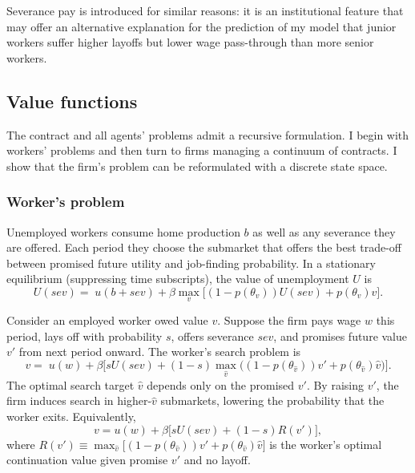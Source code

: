 Severance pay is introduced for similar reasons: it is an institutional feature that may offer an alternative explanation for the prediction of my model that junior workers suffer higher layoffs but lower wage pass-through than more senior workers. 

\subsection{Value functions}
The contract and all agents’ problems admit a recursive formulation. I begin with workers’ problems and then turn to firms managing a continuum of contracts. I show that the firm’s problem can be reformulated with a discrete state space.

\subsubsection*{Worker’s problem} %
Unemployed workers consume home production $b$ as well as any severance they are offered. Each period they choose the submarket that offers the best trade-off between promised future utility and job-finding probability. In a stationary equilibrium (suppressing time subscripts), the value of unemployment $U$ is
\begin{equation}\label{unempproblem}
U(sev)=\; u(b+sev)+\beta\max_{v}\big[(1-p(\theta_v))U(sev)+p(\theta_v)v\big].
\end{equation}

Consider an employed worker owed value $v$. Suppose the firm pays wage $w$ this period, lays off with probability $s$, offers severance $sev$, and promises future value $v'$ from next period onward. The worker’s search problem is
\begin{equation}\label{empproblem}
v=\; u(w)+\beta\Big[sU(sev)+(1-s)\max_{\hat{v}}\big((1-p(\theta_{\hat{v}}))v'+p(\theta_{\hat{v}})\hat{v}\big)\Big].
\end{equation}
The optimal search target $\hat{v}$ depends only on the promised $v'$. By raising $v'$, the firm induces search in higher-$\hat{v}$ submarkets, lowering the probability that the worker exits. Equivalently,
\[
v=u(w)+\beta\big[sU(sev)+(1-s)R(v')\big],
\]
where $R(v')\equiv \max_{\hat{v}}\big[(1-p(\theta_{\hat{v}}))v'+p(\theta_{\hat{v}})\hat{v}\big]$ is the worker’s optimal continuation value given promise $v'$ and no layoff.

